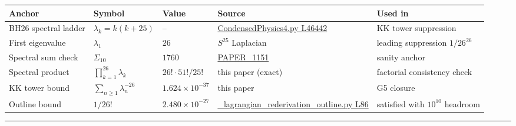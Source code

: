 \documentclass[
]{article}
\newcounter{none} %
\begin{document}
{\def\LTcaptype{none} %
\begin{longtable}[]{@{}
  >{\raggedright\arraybackslash}p{}
  >{\raggedright\arraybackslash}p{}
  >{\raggedleft\arraybackslash}p{}
  >{\raggedright\arraybackslash}p{}
  >{\raggedright\arraybackslash}p{}@{}}
\toprule\noalign{}
\begin{minipage}[b]{\linewidth}\raggedright
Anchor
\end{minipage} & \begin{minipage}[b]{\linewidth}\raggedright
Symbol
\end{minipage} & \begin{minipage}[b]{\linewidth}\raggedleft
Value
\end{minipage} & \begin{minipage}[b]{\linewidth}\raggedright
Source
\end{minipage} & \begin{minipage}[b]{\linewidth}\raggedright
Used in
\end{minipage} \\
\midrule\noalign{}
\endhead
\bottomrule\noalign{}
\endlastfoot
BH26 spectral ladder & \(\lambda_k = k(k+25)\) & -- &
\href{CondensedPhysics4.py\#L46442}{CondensedPhysics4.py L46442} & KK
tower suppression \\
First eigenvalue & \(\lambda_1\) & \(26\) & \(S^{25}\) Laplacian &
leading suppression \(1/26^{26}\) \\
Spectral sum check & \(\Sigma_{10}\) & \(1760\) &
\href{whitepapers/PAPER_1151_VDS_DVP_BH26_Triple_Verification.md}{PAPER\_1151}
& sanity anchor \\
Spectral product & \(\prod_{k=1}^{26}\lambda_k\) & \(26!\cdot 51!/25!\)
& this paper (exact) & factorial consistency check \\
KK tower bound & \(\sum_{n\geq1}\lambda_n^{-26}\) &
\(1.624\times 10^{-37}\) & this paper & G5 closure \\
Outline bound & \(1/26!\) & \(2.480\times 10^{-27}\) &
\href{_lagrangian_rederivation_outline.py\#L86}{\_lagrangian\_rederivation\_outline.py
L86} & satisfied with \(10^{10}\) headroom \\
\end{longtable}
}

\begin{center}\rule{0.5\linewidth}{0.5pt}\end{center}
\end{document}
